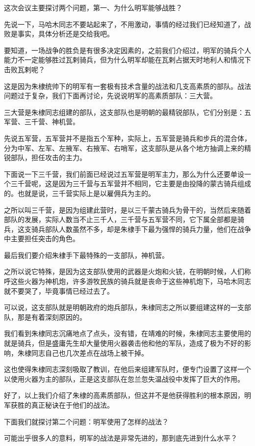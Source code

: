 \begin{multicols}{\theparacolNo}
这次会议主要探讨两个问题，第一、为什么明军能够战胜？

先说一下，马哈木同志不要站起来了，不用激动，事情的经过我们已经知道了，战败是事实，具体分析还是交给我吧。

要知道，一场战争的胜负是有很多决定因素的，之前我们介绍过，明军的骑兵个人能力不一定能够胜过瓦剌骑兵，但为什么明军却能在瓦剌占据天时地利人和情况下击败瓦剌呢？

这是因为朱棣统帅下的明军有一套极有技术含量的战法和几支高素质的部队。战法问题过于复杂，我们下面再讨论，先说说明军的高素质部队：三大营。

三大营是朱棣同志组建的部队，这支部队也是明朝的最精锐部队，它们分别是：五军营、三千营、神机营。

先说五军营，五军营并不是指五个军种，实际上，五军营是骑兵和步兵的混合体，分为中军、左军、左掖军、右掖军、右哨军，这支部队是从各个地方抽调上来的精锐部队，担任攻击的主力。

下面说一下三千营，我们前面已经说过五军营是明军主力，那么为什么还要单设一个三千营呢，这是因为三千营与五军营并不相同，它主要是由投降的蒙古骑兵组成的。也就是说，三千营实际上是以雇佣兵为主的。

之所以叫三千营，是因为组建此营时，是以三千蒙古骑兵为骨干的，当然后来随着部队的发展，实际人数当不止三千人，三千营与五军营不同，它下属全部都是骑兵，这支骑兵部队人数虽然不多，却是朱棣手下最为强悍的骑兵力量，他们在战争中主要担任突击的角色。

最后我们要介绍朱棣手下最特殊的一支部队，神机营。

之所以说它特殊，是因为这支部队使用的武器是火炮和火铳，在明朝时候，人们称呼这些火器为神机炮，许多游牧民族的骑兵就是丧命于这些神机炮下，马哈木同志就不要哭了，毕竟事情已经过去了。

可以说，这支部队就是明朝政府的炮兵部队，朱棣同志之所以要组建这样的一支部队，那是有着深刻原因的。

我们看到朱棣同志沉痛地点了点头，没有错，在靖难的时候，朱棣同志主要使用的就是骑兵，但是盛庸先生却大量使用火器袭击他和他的军队，造成了极为不好的影响，朱棣同志自己也几次差点在战场上被干掉。

这也使得朱棣同志深刻吸取了教训，在他后来组建军队时，便专门设置了这样一个以使用火器为主的部队，正是这支部队在忽兰忽失温战役中发挥了巨大的作用。

好了，以上我们介绍了朱棣的高素质部队，但这并不是他获得胜利的根本原因，明军获胜的真正秘诀在于他们的战法。

下面我们就探讨第二个问题：明军使用了怎样的战法？

可能出乎很多人的意料，明军的战法是非常先进的，那到底先进到什么水平？


\end{multicols}
